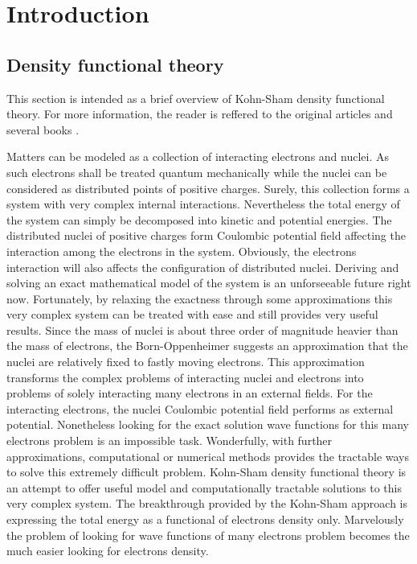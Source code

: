 \chapter{Introduction}

\section{Density functional theory}

This section is intended as a brief overview of Kohn-Sham density functional theory.
For more information, the reader is reffered to the original articles
\cite{Hohenberg1964,Kohn1965} and several books
\cite{Martin2004,Kohanoff2006,Marx2009,Giustino2014}.

Matters can be modeled as a collection of interacting electrons 
and nuclei. As such electrons shall be treated quantum mechanically  while
the nuclei can be considered as distributed points of positive charges. 
Surely, this 
collection forms a system with very complex internal interactions. 
Nevertheless the total energy of the system can simply be decomposed into 
kinetic and potential energies. The distributed nuclei of positive charges 
form Coulombic potential field affecting the interaction among the electrons 
in the system. Obviously, the electrons interaction will also affects the 
configuration of distributed nuclei. Deriving and solving an exact 
mathematical model of the system is an unforseeable future right now. 
Fortunately, by relaxing the exactness through some approximations this 
very complex system can be treated with ease and still provides very useful 
results. Since the mass of nuclei is about three order     
of magnitude heavier than the mass of electrons, the Born-Oppenheimer 
suggests an approximation that the nuclei are relatively fixed to fastly 
moving electrons. This approximation transforms the complex problems of 
interacting nuclei and electrons into problems of solely interacting 
many electrons in an external fields. For the interacting
electrons, the nuclei Coulombic potential field performs as external
potential. Nonetheless looking for the exact solution
wave functions for this many electrons problem is an impossible task. 
Wonderfully, with further approximations, computational or numerical 
methods provides the tractable ways to solve this extremely difficult 
problem.
Kohn-Sham density functional theory \cite{Hohenberg1964,Kohn1965}
is an attempt to offer useful  
model and computationally tractable solutions to this very complex 
system. The breakthrough provided by the Kohn-Sham approach is expressing 
the total energy as a functional of electrons density only. Marvelously 
the problem of looking for wave functions of many electrons problem 
becomes the much easier looking for electrons density.


